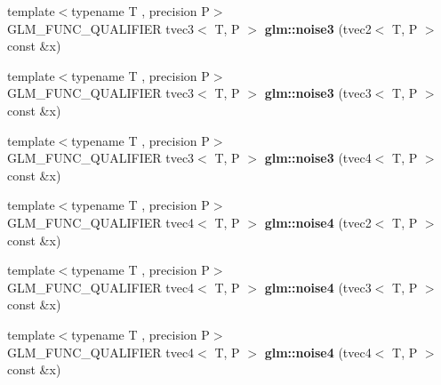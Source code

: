 \begin{DoxyCompactItemize}
\item 
\hypertarget{namespaceglm_a349093c016c130d51c948ef38a5e8477}{{\footnotesize template$<$typename T , precision P$>$ }\\G\-L\-M\-\_\-\-F\-U\-N\-C\-\_\-\-Q\-U\-A\-L\-I\-F\-I\-E\-R tvec3$<$ T, P $>$ {\bfseries glm\-::noise3} (tvec2$<$ T, P $>$ const \&x)}\label{namespaceglm_a349093c016c130d51c948ef38a5e8477}

\item 
\hypertarget{namespaceglm_aa9ed3b1f249c9828e61195216694b59d}{{\footnotesize template$<$typename T , precision P$>$ }\\G\-L\-M\-\_\-\-F\-U\-N\-C\-\_\-\-Q\-U\-A\-L\-I\-F\-I\-E\-R tvec3$<$ T, P $>$ {\bfseries glm\-::noise3} (tvec3$<$ T, P $>$ const \&x)}\label{namespaceglm_aa9ed3b1f249c9828e61195216694b59d}

\item 
\hypertarget{namespaceglm_af4a7d48ed56ac1668f94d911b9dc652a}{{\footnotesize template$<$typename T , precision P$>$ }\\G\-L\-M\-\_\-\-F\-U\-N\-C\-\_\-\-Q\-U\-A\-L\-I\-F\-I\-E\-R tvec3$<$ T, P $>$ {\bfseries glm\-::noise3} (tvec4$<$ T, P $>$ const \&x)}\label{namespaceglm_af4a7d48ed56ac1668f94d911b9dc652a}

\item 
\hypertarget{namespaceglm_a7bad882a23ff4ce1d2bcabc61ef846b3}{{\footnotesize template$<$typename T , precision P$>$ }\\G\-L\-M\-\_\-\-F\-U\-N\-C\-\_\-\-Q\-U\-A\-L\-I\-F\-I\-E\-R tvec4$<$ T, P $>$ {\bfseries glm\-::noise4} (tvec2$<$ T, P $>$ const \&x)}\label{namespaceglm_a7bad882a23ff4ce1d2bcabc61ef846b3}

\item 
\hypertarget{namespaceglm_afd0cc05ffda9121b488641ee2a10ef1c}{{\footnotesize template$<$typename T , precision P$>$ }\\G\-L\-M\-\_\-\-F\-U\-N\-C\-\_\-\-Q\-U\-A\-L\-I\-F\-I\-E\-R tvec4$<$ T, P $>$ {\bfseries glm\-::noise4} (tvec3$<$ T, P $>$ const \&x)}\label{namespaceglm_afd0cc05ffda9121b488641ee2a10ef1c}

\item 
\hypertarget{namespaceglm_a251e7c94bab3e289d4d1e72251c8a8da}{{\footnotesize template$<$typename T , precision P$>$ }\\G\-L\-M\-\_\-\-F\-U\-N\-C\-\_\-\-Q\-U\-A\-L\-I\-F\-I\-E\-R tvec4$<$ T, P $>$ {\bfseries glm\-::noise4} (tvec4$<$ T, P $>$ const \&x)}\label{namespaceglm_a251e7c94bab3e289d4d1e72251c8a8da}

\end{DoxyCompactItemize}


